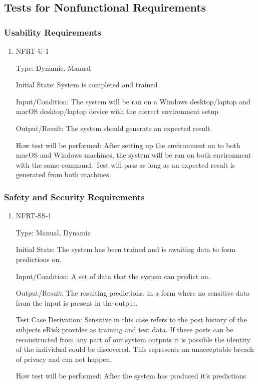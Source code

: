 \documentclass[12pt, titlepage]{article}
\begin{document}
\subsection{Tests for Nonfunctional Requirements}

\subsubsection{Usability Requirements}
		

\begin{enumerate}

\item{NFRT-U-1\\}

Type: Dynamic, Manual
					
Initial State: System is completed and trained
					
Input/Condition: The system will be ran on a Windows desktop/laptop and macOS desktop/laptop device with the correct environment setup
					
Output/Result: The system should generate an expected result 
					
How test will be performed: After setting up the environment on to both macOS and Windows machines, the system will be ran on both environment with the same command. Test will pass as long as an expected result is generated from both machines.


\end{enumerate}


\subsubsection{Safety and Security Requirements}


\begin{enumerate}

	\item{NFRT-SS-1\\}
	
	Type: Manual, Dynamic
						
	Initial State: The system has been trained and is awaiting data to form predictions on.
						
	Input/Condition: A set of data that the system can predict on.
						
	Output/Result: The resulting predictions, in a form where no sensitive data from the input is present in the output.
	
	Test Case Derivation: Sensitive in this case refers to the post history of the subjects eRisk provides as training and test data. If these posts can be reconstructed from any part of our system outputs it is possible the identity of the individual could be discovered. This represents an unacceptable breach of privacy and can not happen.
						
	How test will be performed: After the system has produced it's predictions 
	
\end{enumerate}
\end{document}
